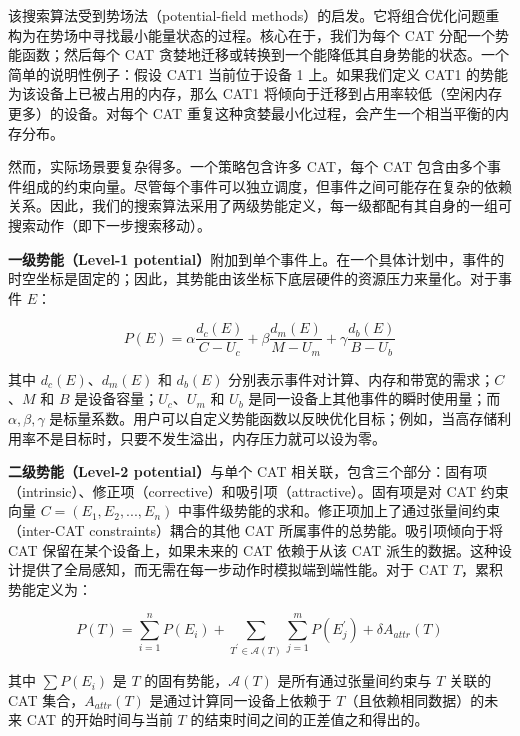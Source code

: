该搜索算法受到势场法（potential-field methods）的启发。它将组合优化问题重构为在势场中寻找最小能量状态的过程。核心在于，我们为每个 CAT 分配一个势能函数；然后每个 CAT 贪婪地迁移或转换到一个能降低其自身势能的状态。一个简单的说明性例子：假设 CAT1 当前位于设备 1 上。如果我们定义 CAT1 的势能为该设备上已被占用的内存，那么 CAT1 将倾向于迁移到占用率较低（空闲内存更多）的设备。对每个 CAT 重复这种贪婪最小化过程，会产生一个相当平衡的内存分布。

然而，实际场景要复杂得多。一个策略包含许多 CAT，每个 CAT 包含由多个事件组成的约束向量。尽管每个事件可以独立调度，但事件之间可能存在复杂的依赖关系。因此，我们的搜索算法采用了两级势能定义，每一级都配有其自身的一组可搜索动作（即下一步搜索移动）。

\textbf{一级势能（Level-1 potential）}附加到单个事件上。在一个具体计划中，事件的时空坐标是固定的；因此，其势能由该坐标下底层硬件的资源压力来量化。对于事件 $E$：

\begin{equation}
P(E)=\alpha\frac{d_{c}(E)}{C-U_{c}}+\beta\frac{d_{m}(E)}{M-U_{m}}+\gamma\frac{d_{b}(E)}{B-U_{b}}
\end{equation}

其中 $d_{c}(E)$、$d_{m}(E)$ 和 $d_{b}(E)$ 分别表示事件对计算、内存和带宽的需求；$C$、$M$ 和 $B$ 是设备容量；$U_{c}$、$U_{m}$ 和 $U_{b}$ 是同一设备上其他事件的瞬时使用量；而 $\alpha, \beta, \gamma$ 是标量系数。用户可以自定义势能函数以反映优化目标；例如，当高存储利用率不是目标时，只要不发生溢出，内存压力就可以设为零。

\textbf{二级势能（Level-2 potential）}与单个 CAT 相关联，包含三个部分：固有项（intrinsic）、修正项（corrective）和吸引项（attractive）。固有项是对 CAT 约束向量 $C=(E_{1},E_{2},...,E_{n})$ 中事件级势能的求和。修正项加上了通过张量间约束（inter-CAT constraints）耦合的其他 CAT 所属事件的总势能。吸引项倾向于将 CAT 保留在某个设备上，如果未来的 CAT 依赖于从该 CAT 派生的数据。这种设计提供了全局感知，而无需在每一步动作时模拟端到端性能。对于 CAT $T$，累积势能定义为：

\begin{equation}
P(T)=\sum_{i=1}^{n}P(E_{i})+\sum_{T^{\prime}\in\mathcal{A}(T)}\sum_{j=1}^{m}P(E_{j}^{\prime})+\delta A_{attr}(T)
\end{equation}

其中 $\sum P(E_{i})$ 是 $T$ 的固有势能，$\mathcal{A}(T)$ 是所有通过张量间约束与 $T$ 关联的 CAT 集合，$A_{attr}(T)$ 是通过计算同一设备上依赖于 $T$（且依赖相同数据）的未来 CAT 的开始时间与当前 $T$ 的结束时间之间的正差值之和得出的。

